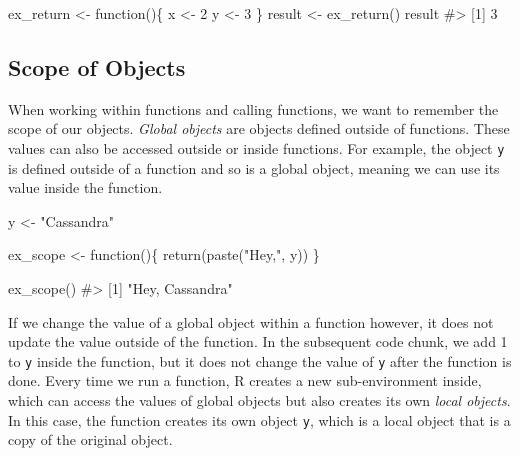 \documentclass[
  letterpaper,
]{latex/krantz}
\makeatletter
\newenvironment{Shaded}{\begin{snugshade}}{\end{snugshade}}
\newcommand{\CommentTok}[1]{\textcolor[rgb]{0.37,0.37,0.37}{#1}}
\newcommand{\ControlFlowTok}[1]{\textcolor[rgb]{0.00,0.23,0.31}{#1}}
\newcommand{\DecValTok}[1]{\textcolor[rgb]{0.68,0.00,0.00}{#1}}
\newcommand{\FunctionTok}[1]{\textcolor[rgb]{0.28,0.35,0.67}{#1}}
\newcommand{\NormalTok}[1]{\textcolor[rgb]{0.00,0.23,0.31}{#1}}
\newcommand{\OtherTok}[1]{\textcolor[rgb]{0.00,0.23,0.31}{#1}}
\newcommand{\StringTok}[1]{\textcolor[rgb]{0.13,0.47,0.30}{#1}}
\newenvironment{kframe}{%
\medskip{}
\setlength{\fboxsep}{.8em}
 \def\at@end@of@kframe{}%
 \ifinner\ifhmode%
  \def\at@end@of@kframe{\end{minipage}}%
  \begin{minipage}{\columnwidth}%
 \fi\fi%
 \def\FrameCommand##1{\hskip\@totalleftmargin \hskip-\fboxsep
 \colorbox{shadecolor}{##1}\hskip-\fboxsep
     \hskip-\linewidth \hskip-\@totalleftmargin \hskip\columnwidth}%
 \MakeFramed {\advance\hsize-\width
   \@totalleftmargin\z@ \linewidth\hsize
   \@setminipage}}%
 {\par\unskip\endMakeFramed%
 \at@end@of@kframe}
\renewenvironment{Shaded}{\begin{kframe}}{\end{kframe}}
\makeatother
\begin{document}
\begin{Shaded}
\begin{Highlighting}[]
\NormalTok{ex\_return }\OtherTok{\textless{}{-}} \ControlFlowTok{function}\NormalTok{()\{}
\NormalTok{  x }\OtherTok{\textless{}{-}} \DecValTok{2}
\NormalTok{  y }\OtherTok{\textless{}{-}} \DecValTok{3}
\NormalTok{\}}
\NormalTok{result }\OtherTok{\textless{}{-}} \FunctionTok{ex\_return}\NormalTok{()}
\NormalTok{result}
\CommentTok{\#\textgreater{} [1] 3}
\end{Highlighting}
\end{Shaded}

\subsection{\texorpdfstring{Scope of Objects
}{Scope of Objects }}\label{scope-of-objects}

When working within functions and calling functions, we want to remember
the scope of our objects. \emph{Global objects} 
are objects defined outside of functions. These values can also be
accessed outside or inside functions. For example, the object \texttt{y}
is defined outside of a function and so is a global object, meaning we
can use its value inside the function.

\begin{Shaded}
\begin{Highlighting}[]
\NormalTok{y }\OtherTok{\textless{}{-}} \StringTok{"Cassandra"}

\NormalTok{ex\_scope }\OtherTok{\textless{}{-}} \ControlFlowTok{function}\NormalTok{()\{}
  \FunctionTok{return}\NormalTok{(}\FunctionTok{paste}\NormalTok{(}\StringTok{"Hey,"}\NormalTok{, y))}
\NormalTok{\}}

\FunctionTok{ex\_scope}\NormalTok{()}
\CommentTok{\#\textgreater{} [1] "Hey, Cassandra"}
\end{Highlighting}
\end{Shaded}

If we change the value of a global object within a function however, it
does not update the value outside of the function. In the subsequent
code chunk, we add 1 to \texttt{y} inside the function, but it does not
change the value of \texttt{y} after the function is done. Every time we
run a function, R creates a new sub-environment inside, which can access
the values of global objects but also creates its own \emph{local
objects}. In this case, the function creates its
own object \texttt{y}, which is a local object that is a copy of the
original object.
\end{document}
